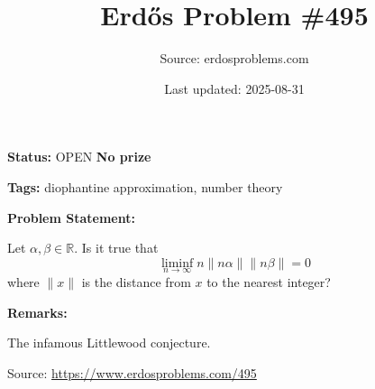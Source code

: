 \documentclass{article}
\title{Erd\H{o}s Problem \#495}
\date{Last updated: 2025-08-31}
\author{Source: erdosproblems.com}
\begin{document}
\maketitle

\noindent\textbf{Status:} OPEN \quad \textbf{No prize}

\noindent\textbf{Tags:} diophantine approximation, number theory

\medskip
\noindent\textbf{Problem Statement:}

Let $\alpha,\beta \in \mathbb{R}$. Is it true that\[\liminf_{n\to \infty} n \| n\alpha \| \| n\beta\| =0\]where $\|x\|$ is the distance from $x$ to the nearest integer?

\bigskip
\noindent\textbf{Remarks:}

The infamous Littlewood conjecture.

\bigskip
\noindent\small{Source: \url{https://www.erdosproblems.com/495}}
\end{document}
